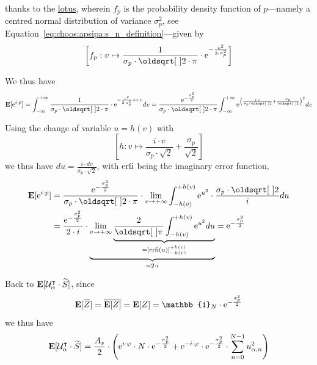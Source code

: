 thanks to the \href{https://web.archive.org/web/20221020124947/https://statproofbook.github.io/P/mean-lotus.html}{\gls{lotus}}\cite{soch2020}, wherein $f_p$ is the probability density function of $p$---namely a centred normal distribution of variance $\sigma_p^2$, see Equation~\ref{eq:choos:apsipa:s_n_definition}---given by
\begin{equation}
	\left[f_p: v \mapsto \frac{1}{\sigma_p \cdot \sqrt{2\cdot \pi}} \cdot \e^{-\frac{v^2}{2\cdot \sigma_p^2}} \right]
\end{equation}

We thus have
\begin{equation}\label{eq:choos:apsipa:remarqid_factor}
	\esp[\e^{i\cdot p}] = \int_{-\infty}^{+\infty} \frac{1}{\sigma_p \cdot \sqrt{2\cdot \pi}} \cdot \e^{-\frac{v^2}{2\cdot \sigma_p^2} + i \cdot v} dv= \frac{\e^{- \frac{\sigma_p^2}{2}}}{\sigma_p \cdot \sqrt{2\cdot \pi}} \int_{-\infty}^{+\infty} \e^{\left(\frac{i\cdot v}{\sigma_p \cdot \sqrt{2}} + \frac{\sigma_p}{\sqrt{2}}\right)^2} dv
\end{equation}

Using the change of variable $u = h(v)$ with
\begin{equation}
	\left[h: v \mapsto \frac{i\cdot v}{\sigma_p \cdot \sqrt{2}} + \frac{\sigma_p}{\sqrt{2}} \right]
\end{equation}
we thus have $du = \frac{i\cdot dv}{\sigma_p \cdot \sqrt{2}}$, with $\operatorname{erfi}$ being the imaginary error function,
\begin{equation}
	\begin{aligned}
		\esp[\e^{i\cdot p}] &= \frac{\e^{- \frac{\sigma_p^2}{2}}}{\sigma_p \cdot \sqrt{2\cdot \pi}} \cdot \lim_{v\to +\infty} \int_{-h(v)}^{+h(v)} \e^{u^2} \cdot \frac{\sigma_p \cdot \sqrt{2}}{i} du \\
		&= \frac{\e^{- \frac{\sigma_p^2}{2}}}{2 \cdot i} \cdot \underbrace{\lim_{v\to +\infty} \underbrace{\frac{2}{\sqrt{\pi}} \int_{-h(v)}^{+h(v)} \e^{u^2} du}_{= \left[\erfi(u)\right]^{+h(v)}_{-h(v)}}}_{=2\cdot i} = \e^{- \frac{\sigma_p^2}{2}}
	\end{aligned}
\end{equation}

Back to $\mathbf{E}[\mathcal{U}_\alpha^\intercal\cdot \widetilde{S} ]$, since
\begin{equation}
	\esp[\conj{Z}] = \conj{\esp[Z]} = \esp[Z] = \mathbb{1}_N \cdot \e^{- \frac{\sigma_p^2}{2}}
\end{equation}
we thus have
\begin{equation}\label{eq:choos:apsipa:before_cyclo}
	\mathbf{E}[\mathcal{U}_\alpha^\intercal\cdot \widetilde{S}] = \frac{A_s}{2} \cdot \Biggl( \mathrm{e}^{i \cdot \varphi} \cdot N \cdot \mathrm{e}^{- \frac{\sigma_p^2}{2}} + \mathrm{e}^{-i\cdot \varphi} \cdot \mathrm{e}^{- \frac{\sigma_p^2}{2}} \cdot \sum_{n=0}^{N-1} u_{\alpha,n}^2 \Biggr)
\end{equation}

